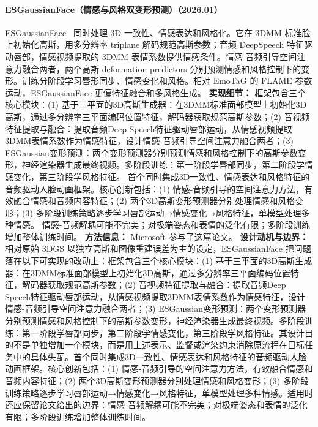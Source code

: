 \paragraph{ESGaussianFace（情感与风格双变形预测）（2026.01）}
ESGaussianFace~\cite{2601_01847} 同时处理 3D 一致性、情感表达和风格化。它在 3DMM 标准脸上初始化高斯，用多分辨率 triplane 解码规范高斯参数；音频 DeepSpeech 特征驱动唇部，情感视频提取的 3DMM 表情系数提供情感条件。情感-音频引导空间注意力融合两者，两个高斯 deformation predictors 分别预测情感和风格控制下的变形。训练分阶段学习唇形同步、情感变化和风格。相对 EmoTaG 的 FLAME 参数运动，ESGaussianFace 更偏特征融合和多风格生成。
\textbf{实现细节：} 框架包含三个核心模块：(1) 基于三平面的3D高斯生成器：在3DMM标准面部模型上初始化3D高斯，通过多分辨率三平面编码位置特征，解码器获取规范高斯参数；(2) 音视频特征提取与融合：提取音频Deep Speech特征驱动唇部运动，从情感视频提取3DMM表情系数作为情感特征，设计情感-音频引导空间注意力融合两者；(3) ESGaussian变形预测：两个变形预测器分别预测情感和风格控制下的高斯参数变形，神经渲染器生成最终视频。多阶段训练：第一阶段学唇部同步，第二阶段学情感变化，第三阶段学风格特征。 首个同时集成3D一致性、情感表达和风格特征的音频驱动人脸动画框架。核心创新包括：(1) 情感-音频引导的空间注意力方法，有效融合情感和音频内容特征；(2) 两个3D高斯变形预测器分别处理情感和风格变形；(3) 多阶段训练策略逐步学习唇部运动→情感变化→风格特征，单模型处理多种情感。 情感-音频解耦可能不完美；对极端姿态和表情的泛化有限；多阶段训练增加整体训练时间。
\textbf{方法信息：} Microsoft 参与了这篇论文。
\textbf{设计动机与边界：} 相对原始 3DGS 以独立高斯和图像重建误差为主的设定，ESGaussianFace 把问题落在以下可实现的改动上：框架包含三个核心模块：(1) 基于三平面的3D高斯生成器：在3DMM标准面部模型上初始化3D高斯，通过多分辨率三平面编码位置特征，解码器获取规范高斯参数；(2) 音视频特征提取与融合：提取音频Deep Speech特征驱动唇部运动，从情感视频提取3DMM表情系数作为情感特征，设计情感-音频引导空间注意力融合两者；(3) ESGaussian变形预测：两个变形预测器分别预测情感和风格控制下的高斯参数变形，神经渲染器生成最终视频。多阶段训练：第一阶段学唇部同步，第二阶段学情感变化，第三阶段学风格特征。其设计目的不是单独增加一个模块，而是用上述表示、监督或渲染约束消除原流程在目标任务中的具体失配。首个同时集成3D一致性、情感表达和风格特征的音频驱动人脸动画框架。核心创新包括：(1) 情感-音频引导的空间注意力方法，有效融合情感和音频内容特征；(2) 两个3D高斯变形预测器分别处理情感和风格变形；(3) 多阶段训练策略逐步学习唇部运动→情感变化→风格特征，单模型处理多种情感。适用时还应保留论文给出的边界：情感-音频解耦可能不完美；对极端姿态和表情的泛化有限；多阶段训练增加整体训练时间。
